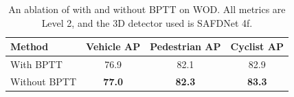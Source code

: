 \begin{table}[t]
    \centering
    \footnotesize
    \begin{tabular}{@{}lccc@{}}
        \toprule
        Method                              & Vehicle AP    & Pedestrian AP & Cyclist AP     \\ 
        \midrule
        With BPTT                       & 76.9        & 82.1          & 82.9           \\ 
        Without BPTT                    & \textbf{77.0} & \textbf{82.3} & \textbf{83.3}  \\
        \bottomrule
    \end{tabular}
    \caption{An ablation of \ourmodel{} with and without BPTT on WOD. All metrics are Level 2, and the 3D detector used is SAFDNet 4f.}
    \label{tab:features}
\end{table}